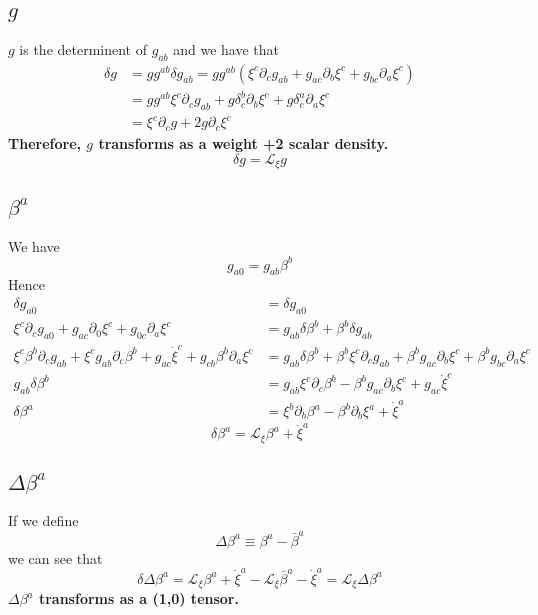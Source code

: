 \documentclass{article}
\begin{document}
\subsection{$g$}
$g$ is the determinent of $g_{ab}$ and we have that
\begin{align*}
\delta g & = gg^{ab}\delta g_{ab} = gg^{ab}(\xi^{c}\partial_{c}g_{ab} + g_{ac}\partial_{b}\xi^{c} + g_{bc}\partial_{a}\xi^{c})\\
& = gg^{ab}\xi^{c}\partial_{c}g_{ab} + g\delta^{b}_{c}\partial_{b}\xi^{c} + g\delta^{a}_{c}\partial_{a}\xi^{c}\\
& = \xi^{c}\partial_{c}g + 2g\partial_{c}\xi^{c}
\end{align*}
{\bf {\color{red}Therefore, $g$ transforms as a weight +2 scalar density.}}
\[
\boxed{
\delta g = \mathcal{L}_{\xi}g
}
\]
\subsection{$\beta^{a}$}
We have
\[
g_{a0} = g_{ab}\beta^{b}
\]
Hence
\begin{align*}
\delta g_{a0} & = \delta g_{a0}\\
\xi^{c}\partial_{c}g_{a0} + g_{ac}\partial_{0}\xi^{c} + g_{0c}\partial_{a}\xi^{c} & = g_{ab}\delta \beta^{b} + \beta^{b}\delta g_{ab}\\
\xi^{c}\beta^{b}\partial_{c}g_{ab} + \xi^{c}g_{ab}\partial_{c}\beta^{b} + g_{ac}{\dot \xi}^{c} + g_{cb}\beta^{b}\partial_{a}\xi^{c} & = g_{ab}\delta \beta^{b} + \beta^{b}\xi^{c}\partial_{c}g_{ab} + \beta^{b}g_{ac}\partial_{b}\xi^{c} + \beta^{b}g_{bc}\partial_{a}\xi^{c}\\
g_{ab}\delta \beta^{b} & = g_{ab}\xi^{c}\partial_{c}\beta^{b} - \beta^{b}g_{ac}\partial_{b}\xi^{c} + g_{ac}{\dot \xi}^{c}\\
\delta \beta^{a} & = \xi^{b}\partial_{b}\beta^{a} - \beta^{b}\partial_{b}\xi^{a} + {\dot \xi}^{a}
\end{align*}
\[
\boxed{
\delta \beta^{a} = \mathcal{L}_{\xi}\beta^{a} + {\dot \xi}^{a}
}
\]
\subsection{$\Delta \beta^{a}$}
If we define
\[
\Delta \beta^{a} \equiv \beta^{a} - {\bar \beta}^{a}
\]
we can see that
\[
\boxed{
\delta \Delta \beta^{a} = \mathcal{L}_{\xi}\beta^{a} + {\dot \xi}^{a} - \mathcal{L}_{\xi}{\bar \beta}^{a} - {\dot \xi}^{a} = \mathcal{L}_{\xi}\Delta \beta^{a}
}
\]
{\bf{\color{red} $\Delta \beta^{a}$ transforms as a (1,0) tensor. }}
\end{document}
